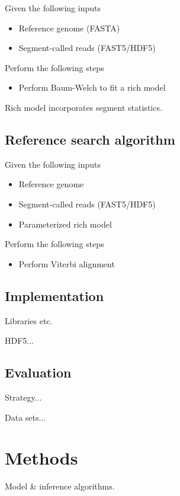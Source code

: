 \documentclass[10pt]{article}
\begin{document}
Given the following inputs
\begin{itemize}
\item Reference genome (FASTA)
\item Segment-called reads (FAST5/HDF5)
\end{itemize}

Perform the following steps
\begin{itemize}
\item Perform Baum-Welch to fit a rich model
\end{itemize}

Rich model incorporates segment statistics.

\subsection{Reference search algorithm}

Given the following inputs
\begin{itemize}
\item Reference genome
\item Segment-called reads (FAST5/HDF5)
\item Parameterized rich model
\end{itemize}

Perform the following steps
\begin{itemize}
\item Perform Viterbi alignment
\end{itemize}

\subsection{Implementation}

Libraries etc.

HDF5...

\subsection{Evaluation}

Strategy...

Data sets...

\section{Methods}

Model \& inference algorithms.

\newcommand\paramlabel[1]{\mbox{\tiny #1}}
\end{document}
